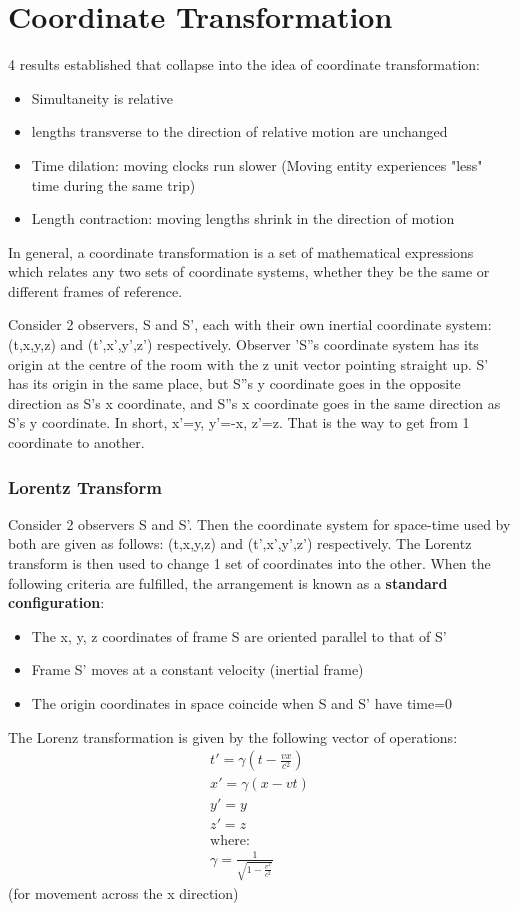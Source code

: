 \documentclass[10pt]{report}
\begin{document}
{\section{Coordinate Transformation}
\par{ 4 results established that collapse into the idea of coordinate transformation:
	\begin{itemize}
		\item{Simultaneity is relative}
		\item{lengths transverse to the direction of relative motion are unchanged}
		\item{Time dilation: moving clocks run slower (Moving entity experiences "less" time during the same trip)}
		\item{Length contraction: moving lengths shrink in the direction of motion}
	\end{itemize}
In general, a coordinate transformation is a set of mathematical expressions which relates any two sets of coordinate systems, whether they be the same or different frames of reference. }
\par{Consider 2 observers, S and S', each with their own inertial coordinate system:(t,x,y,z) and (t',x',y',z') respectively. Observer 'S''s coordinate system has its origin at the centre of the room with the z unit vector pointing straight up. S' has its origin in the same place, but S''s y coordinate goes in the opposite direction as S's x coordinate, and S''s x coordinate goes in the same direction as S's y coordinate. In short, x'=y, y'=-x, z'=z. That is the way to get from 1 coordinate to another.}
\subsubsection{Lorentz Transform}
\par{Consider 2 observers S and S'. Then the coordinate system for space-time used by both are given as follows: (t,x,y,z) and (t',x',y',z') respectively. The Lorentz transform is then used to change 1 set of coordinates into the other. When the following criteria are fulfilled, the arrangement is known as a \textbf{standard configuration}:
	\begin{itemize}
		\item{The x, y, z coordinates of frame S are oriented parallel to that of S'}
		\item{Frame S' moves at a constant velocity (inertial frame)}
		\item{The origin coordinates in space coincide when S and S' have time=0}
	\end{itemize}
The Lorenz transformation is given by the following vector of operations:
\begin{align*}
	t'=\gamma\left(t-\frac{vx}{c^{2}}\right) \\
	x'=\gamma\left(x-vt\right) \\
	y'=y \\
	z'=z \\
	\text{where:} \\
	\gamma=\frac{1}{\sqrt{1-\frac{v^{2}}{c^{2}}}}
\end{align*}
(for movement across the x direction)
}
}
\end{document}
